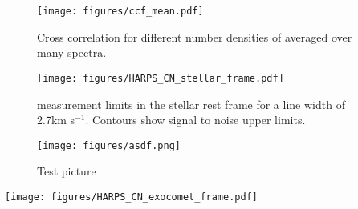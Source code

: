 \documentclass{aa}
\newcommand{\kms}{km s$^{-1}$}
\newcommand{\bp}{Beta Pictoris}
\begin{document}
\begin{figure}
    \begin{centering}
        \texttt{[image: figures/ccf\_mean.pdf]}
        \caption{Cross correlation for different number densities of  averaged over many spectra.}
        \label{fig:ccf_mean}
    \end{centering}
\end{figure}

\begin{figure}
    \begin{centering}
        \texttt{[image: figures/HARPS\_CN\_stellar\_frame.pdf]}
        \caption{ measurement limits in the stellar rest frame for a  line width of 2.7\kms{}. Contours show signal to noise upper limits.}
        \label{fig:CN_stellar_frame}
    \end{centering}
\end{figure}


\begin{figure}
    \begin{centering}
        \texttt{[image: figures/asdf.png]}
        \caption{Test picture}
        \label{fig:test}
    \end{centering}
\end{figure}


\begin{figure*}
    \begin{centering}
        \texttt{[image: figures/HARPS\_CN\_exocomet\_frame.pdf]}
        \caption{ measurement limits in the exocomet frame for a  line width of 2.7, 10 and 20\kms{}. Contours show signal to noise upper limits.}
        \label{fig:CN_exocomet_frame}
    \end{centering}
\end{figure*}






\end{document}
